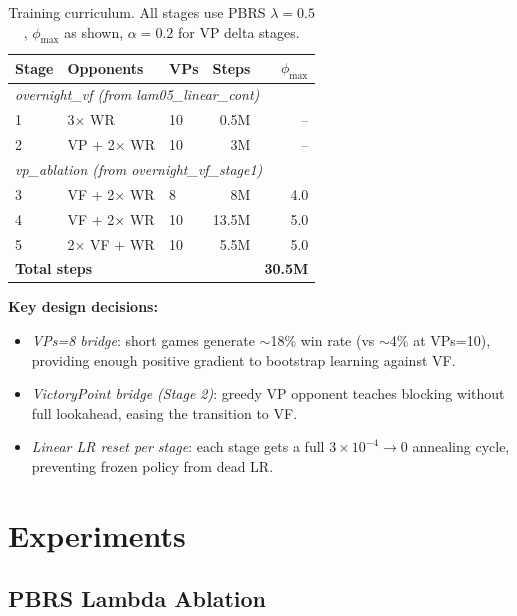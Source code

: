 \documentclass[10pt,twocolumn]{article}
\begin{document}
\begin{table}[H]
\centering
\caption{Training curriculum. All stages use PBRS $\lambda{=}0.5$,
$\phi_{\max}$ as shown, $\alpha{=}0.2$ for VP delta stages.}
\label{tab:curriculum}
\small
\begin{tabular}{@{}lllrr@{}}
\toprule
Stage & Opponents & VPs & Steps & $\phi_{\max}$ \\
\midrule
\multicolumn{5}{l}{\textit{overnight\_vf (from lam05\_linear\_cont)}} \\
1 & 3$\times$ WR & 10 & 0.5M & -- \\
2 & VP + 2$\times$ WR & 10 & 3M  & -- \\
\midrule
\multicolumn{5}{l}{\textit{vp\_ablation (from overnight\_vf\_stage1)}} \\
3 & VF + 2$\times$ WR & 8  & 8M   & 4.0 \\
4 & VF + 2$\times$ WR & 10 & 13.5M & 5.0 \\
5 & 2$\times$ VF + WR & 10 & 5.5M  & 5.0 \\
\midrule
\multicolumn{4}{l}{\textbf{Total steps}} & \textbf{30.5M} \\
\bottomrule
\end{tabular}
\end{table}

\noindent\textbf{Key design decisions:}
\begin{itemize}
  \item \emph{VPs=8 bridge}: short games generate $\sim$18\% win rate (vs $\sim$4\%
        at VPs=10), providing enough positive gradient to bootstrap learning
        against VF.
  \item \emph{VictoryPoint bridge (Stage 2)}: greedy VP opponent teaches blocking
        without full lookahead, easing the transition to VF.
  \item \emph{Linear LR reset per stage}: each stage gets a full $3\!\times\!10^{-4}\!\to\!0$
        annealing cycle, preventing frozen policy from dead LR.
\end{itemize}

\section{Experiments}

\subsection{PBRS Lambda Ablation}
\end{document}
